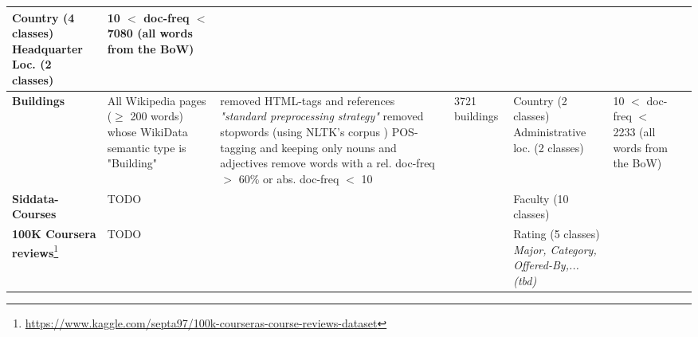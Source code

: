 \begin{landscape}
\begin{table}[]
{\begin{tabular}{@{}lllllll@{}}
					\specialcell[l]{ \tabitem Country (4 classes)\\ \tabitem Headquarter Loc. (2 classes)} &
					\specialcell[l]{ 10 $<$ doc-freq $<$ 7080 \\ (all words from the BoW)} \\ \midrule
				\textbf{Buildings\footnoteref{fnote:for_alshaikh2019} \cite{Alshaikh2020}} &
					\specialcell[l]{All Wikipedia pages ($\geq$ 200 words) whose \\ WikiData semantic type is "Building"} &
					\specialcell[l]{ \tabitem removed HTML-tags and references \\ \tabitem \textit{"standard preprocessing strategy"} \cite[137]{Alshaikh2019} \\ \tabitem removed stopwords (using NLTK's corpus \cite{loper-bird-2002-nltk})\\ \tabitem POS-tagging and keeping only nouns and adjectives \\ \tabitem remove words with a rel. doc-freq  $>$ 60\% or abs. doc-freq $<$ 10 } &
					3721 buildings &
					\specialcell[l]{ \tabitem Country (2 classes)\\ \tabitem Administrative loc. (2 classes)} &
					\specialcell[l]{10 $<$ doc-freq $<$ 2233 \\ (all words from the BoW) }\\ \midrule \midrule
				\textbf{Siddata-Courses} &
					TODO &
					&
					&
					\tabitem Faculty (10 classes) 
					\\ \midrule 
				\textbf{100K Coursera reviews}\footnote{\url{https://www.kaggle.com/septa97/100k-courseras-course-reviews-dataset}} &
					TODO &
					&
					&
					\specialcell[l]{ \tabitem Rating (5 classes) \\ \textit{\tabitem Major, Category, Offered-By,... (tbd)} }
					\\ 
			\end{tabular}
			\label{tab:all_datasets}
		}
	\end{table}
\end{landscape}	


\restoregeometry
